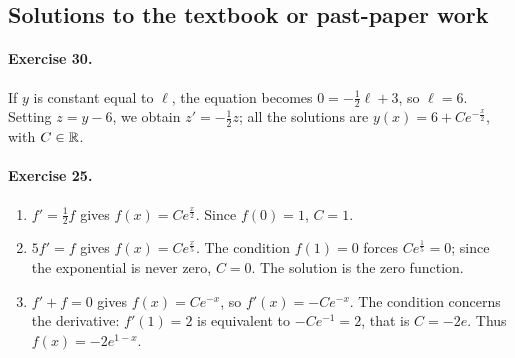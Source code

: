 \subsection{Solutions to the textbook or past-paper work}\paragraph{Exercise 30.} If $y$ is constant equal to $\ell$, the equation becomes $0=-\frac12\ell+3$, so $\ell=6$. Setting $z=y-6$, we obtain $z'=-\frac12z$; all the solutions are $y(x)=6+Ce^{-\frac x2}$, with $C\in\mathbb R$.
\paragraph{Exercise 25.}
\begin{enumerate}
\item $f'=\frac12f$ gives $f(x)=Ce^{\frac x2}$. Since $f(0)=1$, $C=1$.
\item $5f'=f$ gives $f(x)=Ce^{\frac x5}$. The condition $f(1)=0$ forces $Ce^{\frac15}=0$; since the exponential is never zero, $C=0$. The solution is the zero function.
\item $f'+f=0$ gives $f(x)=Ce^{-x}$, so $f'(x)=-Ce^{-x}$. The condition concerns the derivative: $f'(1)=2$ is equivalent to $-Ce^{-1}=2$, that is $C=-2e$. Thus $f(x)=-2e^{1-x}$.
\end{enumerate}

\fi
